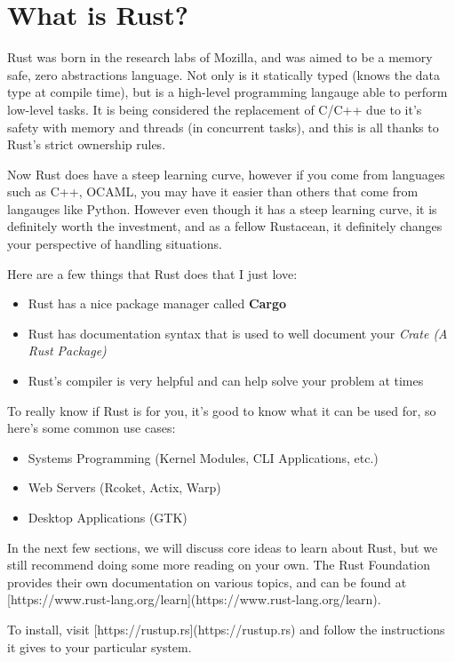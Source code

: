 \chapter{What is Rust?}

\par Rust was born in the research labs of Mozilla, and was aimed to be 
a memory safe, zero abstractions language. Not only is it statically typed (knows the data type at compile time), 
but is a high-level programming langauge able to perform low-level tasks. It is being considered the replacement of 
C/C++ due to it's safety with memory and threads (in concurrent tasks), and this is all thanks to Rust's strict ownership rules. 

\par Now Rust does have a steep learning curve, however if you come from languages such as C++, OCAML, you may have it easier than 
others that come from langauges like Python. However even though it has a steep learning curve, it is definitely worth the investment, and as a fellow Rustacean, it definitely changes your perspective of handling situations. 

\par \noindent Here are a few things that Rust does that I just love: 
\begin{itemize}
    \item Rust has a nice package manager called \textbf{Cargo}
    \item Rust has documentation syntax that is used to well 
    document your \textit{Crate (A Rust Package)} 
    \item Rust's compiler is very helpful and can help solve your problem at times
\end{itemize}

\par \noindent To really know if Rust is for you, it's good to know what it can be used for, so here's some common use cases: 
\begin{itemize}
    \item Systems Programming (Kernel Modules, CLI Applications, etc.)
    \item Web Servers (Rcoket, Actix, Warp)
    \item Desktop Applications (GTK)
\end{itemize}

\par In the next few sections, we will discuss core ideas to learn about Rust, but we still recommend doing some more reading on your own. The Rust Foundation provides their own documentation on various topics, and can be found at [https://www.rust-lang.org/learn](https://www.rust-lang.org/learn).

\par To install, visit [https://rustup.rs](https://rustup.rs) and follow the instructions it gives to your particular system. 